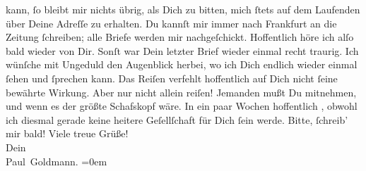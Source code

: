 \begin{ledgroupsized}[t]{13cm}
               kann, ſo bleibt mir nichts übrig, als Dich zu bitten, mich ſtets auf dem Laufenden
               über Deine Adreſſe zu erhalten. Du kannſt mir immer nach Frankfurt an die Zeitung ſchreiben; alle Briefe werden mir nachgeſchickt. {\pb}Hoffentlich höre ich alſo bald wieder von Dir.\pend
           \pstart
           Sonſt war Dein letzter Brief  wieder einmal recht
               traurig. Ich wünſche mit Ungeduld den Augenblick herbei, wo ich Dich endlich wieder
               einmal  ſehen und ſprechen kann. Das Reiſen verfehlt hoffentlich auf Dich nicht ſeine
               bewährte Wirkung. Aber nur nicht allein reiſen! Jemanden mußt Du mitnehmen, und wenn
               es der größte Schafskopf wäre. In ein paar Wochen hoffentlich \label{K_L02878-4v}\label{K_L02878-4h},
                  \strikeout{\textcolor{gray}{×}\-\textcolor{gray}{×}} obwohl ich diesmal gerade keine heitere Geſellſchaft für Dich ſein werde.\pend
           \pstart
           Bitte, ſchreib’ mir bald!\pend
           \pstart
           Viele treue Grüße! {\\[\baselineskip]}Dein {\\[\baselineskip]}\spacefill\mbox{Paul Goldmann.}\pend
           \leftskip=0em{}
         
         \endnumbering{}\end{ledgroupsized}  \newcommand{\dateiname}{L02878}\newcommand{\titel}{Paul Goldmann an Arthur Schnitzler, 2. 7. 1899}\newcommand{\editorInnen}{Martin Anton Müller und Laura Untner}
      